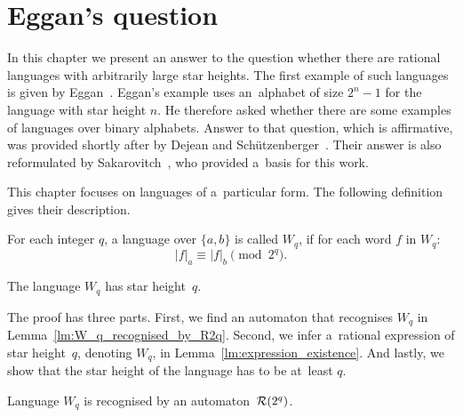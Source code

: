 \chapter{Eggan's question}

In this chapter we present an answer to the question whether there are rational languages with arbitrarily large star heights. The first example of such languages is given by Eggan~\cite{Eggan63}. Eggan's example uses an~alphabet of size $2^n - 1$ for the language with star height $n$. He therefore asked whether there are some examples of languages over binary alphabets. Answer to that question, which is affirmative, was provided shortly after by Dejean and Schützenberger~\cite{DejeanSchutzenberger66}. Their answer is also reformulated by Sakarovitch~\cite{Sakarovitch09}, who  provided a~basis for this work.

This chapter focuses on languages of a~particular form. The following definition gives their description.

\begin{defn}
    For each integer $q$, a language over $\{a, b\}$ is called $W_q$, if for each word $f$ in $W_q$:
    \[
        |f|_a \equiv |f|_b \pmod{2^q}.
    \]
\end{defn}

\begin{thm}\label{thm:main}
    The language $W_q$ has star height~$q$.
\end{thm}

The proof has three parts. First, we find an automaton that recognises $W_q$ in Lemma~\ref*{lm:W_q_recognised_by_R2q}. Second, we infer a~rational expression of star height~$q$, denoting $W_q$, in Lemma~\ref*{lm:expression_existence}. And lastly, we show that the star height of the language has to be at~least $q$.

\begin{lemma}\label{lm:W_q_recognised_by_R2q}
    Language $W_q$ is recognised by an automaton~${\mathcal{R}}(2^q)$.
\end{lemma}

